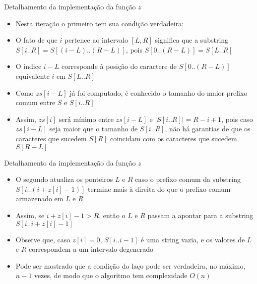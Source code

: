 \begin{frame}[fragile]{Detalhamento da implementação da função $z$}

    \begin{itemize}
        \item Nesta iteração o primeiro  tem sua condição verdadeira: 

        \vspace{0.1in}
        \vspace{0.1in}

        \item O fato de que $i$ pertence ao intervalo $[L, R]$ significa que a substring 
            $S[i..R] = S[(i-L)..(R-L)]$, pois $S[0..(R-L)] = S[L..R]$

        \item O índice $i-L$ corresponde à posição do caractere de $S[0..(R-L)]$ equivalente 
            $i$ em $S[L..R]$

        \item Como $zs[i-L]$ já foi computado, é conhecido o tamanho do maior prefixo comum entre 
            $S$ e $S[i..R]$

        \item Assim, $zs[i]$ será  mínimo entre $zs[i-L]$ e $|S[i..R]| = R-i+1$, pois caso 
            $zs[i-L]$ seja maior que o tamanho de $S[i..R]$, não há garantias de que os caracteres
            que sucedem $S[R]$ coincidam com os caracteres que sucedem $S[R-L]$

    \end{itemize}

\end{frame}

\begin{frame}[fragile]{Detalhamento da implementação da função $z$}

    \begin{itemize}
        \item O segundo  atualiza os ponteiros $L$ e $R$ caso o prefixo
            comum da substring $S[i..(i+z[i]-1)]$ termine mais à direita do que o prefixo
            comum armazenado em $L$ e $R$

        \item Assim, se $i+z[i]-1 > R$, então o $L$ e $R$ passam a apontar para a substring 
            $S[i..i+z[i]-1]$

        \vspace{0.1in}
        \vspace{0.1in}

        \item Observe que, caso $z[i] = 0$, $S[i..i-1]$ é uma string vazia, e os valores de
            $L$ e $R$ correspondem a um intervalo degenerado

        \item Pode ser mostrado que a condição do laço  pode ser verdadeira, no
            máximo, $n - 1$ vezes, de modo que o algoritmo tem complexidade $O(n)$

    \end{itemize}

\end{frame}

